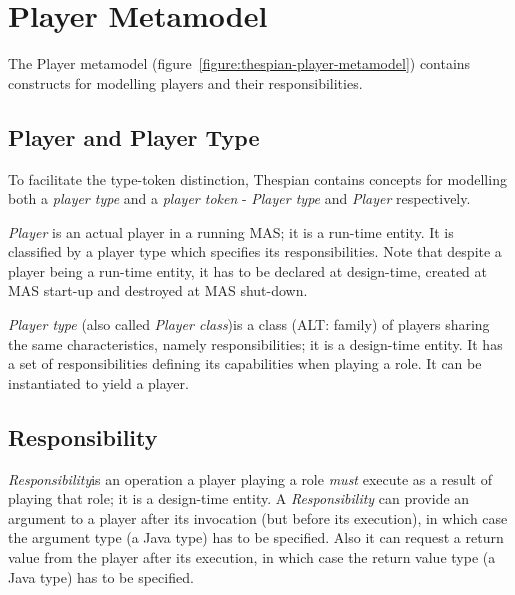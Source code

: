\section{Player Metamodel}

The Player metamodel (figure~\ref{figure:thespian-player-metamodel}) contains constructs for modelling players and their responsibilities.

\subsection*{Player and Player Type}

To facilitate the type-token distinction, Thespian contains concepts for modelling both a \textit{player type} and a \textit{player token} - \textit{Player type} and \textit{Player} respectively.

\textit{Player} is an actual player in a running MAS; it is a run-time entity.
It is classified by a player type which specifies its responsibilities.
Note that despite a player being a run-time entity, it has to be declared at design-time, created at MAS start-up and destroyed at MAS shut-down.

\textit{Player type} (also called \textit{Player class})is a class (ALT: family) of players sharing the same characteristics, namely responsibilities; it is a design-time entity.
It has a set of responsibilities defining its capabilities when playing a role.
It can be instantiated to yield a player. 

\subsection*{Responsibility}

\textit{Responsibility}is an operation a player playing a role \textit{must} execute as a result of playing that role; it is a design-time entity. 
A \textit{Responsibility} can provide an argument to a player after its invocation (but before its execution), in which case the argument type (a Java type) has to be specified.
Also it can request a return value from the player after its execution, in which case the return value type (a Java type) has to be specified.

